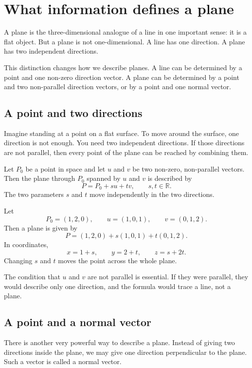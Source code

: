 \section{What information defines a plane}

A plane is the three-dimensional analogue of a line in one important sense: it is a flat object. But a plane is not one-dimensional. A line has one direction. A plane has two independent directions.

This distinction changes how we describe planes. A line can be determined by a point and one non-zero direction vector. A plane can be determined by a point and two non-parallel direction vectors, or by a point and one normal vector.

\subsection*{A point and two directions}

Imagine standing at a point on a flat surface. To move around the surface, one direction is not enough. You need two independent directions. If those directions are not parallel, then every point of the plane can be reached by combining them.

Let \(P_0\) be a point in space and let \(u\) and \(v\) be two non-zero, non-parallel vectors. Then the plane through \(P_0\) spanned by \(u\) and \(v\) is described by
\[
P=P_0+s u+t v,
\qquad s,t\in\mathbb{R}.
\]
The two parameters \(s\) and \(t\) move independently in the two directions.

\begin{examplebox}
Let
\[
P_0=(1,2,0),
\qquad
u=(1,0,1),
\qquad
v=(0,1,2).
\]
Then a plane is given by
\[
P=(1,2,0)+s(1,0,1)+t(0,1,2).
\]
In coordinates,
\[
x=1+s,
\qquad
y=2+t,
\qquad
z=s+2t.
\]
Changing \(s\) and \(t\) moves the point across the whole plane.
\end{examplebox}

The condition that \(u\) and \(v\) are not parallel is essential. If they were parallel, they would describe only one direction, and the formula would trace a line, not a plane.

\subsection*{A point and a normal vector}

There is another very powerful way to describe a plane. Instead of giving two directions inside the plane, we may give one direction perpendicular to the plane. Such a vector is called a normal vector.

